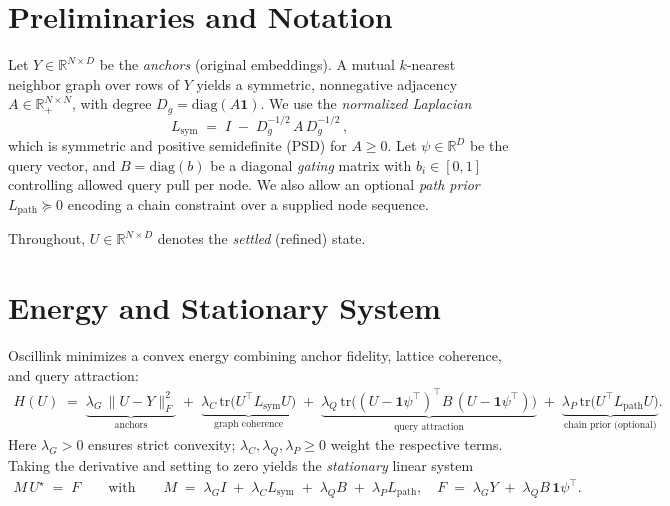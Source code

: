 \documentclass[11pt]{article}
\begin{document}
\vspace{-0.5em}
\section{Preliminaries and Notation}
Let $Y\in\mathbb{R}^{N\times D}$ be the \emph{anchors} (original embeddings). A mutual $k$-nearest neighbor graph over rows of $Y$ yields a symmetric, nonnegative adjacency $A\in\mathbb{R}_+^{N\times N}$, with degree $D_g = \mathrm{diag}(A\mathbf{1})$. We use the \emph{normalized Laplacian}
\[
  L_{\mathrm{sym}} \;=\; I \;-\; D_g^{-1/2} \, A \, D_g^{-1/2}\,,
\]
which is symmetric and positive semidefinite (PSD) for $A\!\ge 0$. Let $\psi\in\mathbb{R}^{D}$ be the query vector, and $B=\mathrm{diag}(b)$ be a diagonal \emph{gating} matrix with $b_i\!\in[0,1]$ controlling allowed query pull per node. We also allow an optional \emph{path prior} $L_{\mathrm{path}}\succeq 0$ encoding a chain constraint over a supplied node sequence.

Throughout, $U\in\mathbb{R}^{N\times D}$ denotes the \emph{settled} (refined) state.

\vspace{-0.5em}
\section{Energy and Stationary System}
Oscillink minimizes a convex energy combining anchor fidelity, lattice coherence, and query attraction:
\begin{align}
\label{eq:energy}
H(U) \;=\;
\underbrace{\lambda_G \, \|U - Y\|_F^2}_{\text{anchors}}
\;+\;
\underbrace{\lambda_C \, \mathrm{tr}\!\big(U^\top L_{\mathrm{sym}} U\big)}_{\text{graph coherence}}
\;+\;
\underbrace{\lambda_Q \, \mathrm{tr}\!\big((U-\mathbf{1}\psi^\top)^\top B \, (U-\mathbf{1}\psi^\top)\big)}_{\text{query attraction}}
\;+\;
\underbrace{\lambda_P \, \mathrm{tr}\!\big(U^\top L_{\mathrm{path}} U\big)}_{\text{chain prior (optional)}}.
\end{align}
Here $\lambda_G>0$ ensures strict convexity; $\lambda_C,\lambda_Q,\lambda_P\ge 0$ weight the respective terms. Taking the derivative and setting to zero yields the \emph{stationary} linear system
\begin{align}
\label{eq:stationary}
M \, U^\star \;=\; F
\qquad\text{with}\qquad
M \;=\; \lambda_G I \;+\; \lambda_C L_{\mathrm{sym}} \;+\; \lambda_Q B \;+\; \lambda_P L_{\mathrm{path}},
\quad
F \;=\; \lambda_G Y \;+\; \lambda_Q B \,\mathbf{1}\psi^\top.
\end{align}
\end{document}

